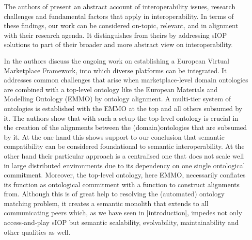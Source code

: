 \documentclass[sort&compress,preprint,authoryear,3p,twocolumn]{elsarticle}
\begin{document}
The authors of \citep{Pagano2013a} present an abstract account of
interoperability issues, research challenges and fundamental factors
that apply in interoperability. In terms of these findings, our work can
be considered on-topic, relevant, and in alignment with their research
agenda. It distinguishes from theirs by addressing sIOP solutions to
part of their broader and more abstract view on interoperability.

In \citep{Horsch2020} the authors discuss the ongoing work on
establishing a European Virtual Marketplace Framework, into which
diverse platforms can be integrated. It addresses common challenges that
arise when marketplace-level domain ontologies are combined with a
top-level ontology like the European Materials and Modelling Ontology
(EMMO) by ontology alignment. A multi-tier system of ontologies is
established with the EMMO at the top and all others subsumed by it. The
authors show that with such a setup the top-level ontology is crucial in
the creation of the alignments between the (domain)ontologies that are
subsumed by it. At the one hand this shows support to our conclusion
that semantic compatibility can be considered foundational to semantic
interoperability. At the other hand their particular approach is a
centralised one that does not scale well in large distributed
environments due to its dependency on one single ontological commitment.
Moreover, the top-level ontology, here EMMO, necessarily conflates its
function as ontological commitment with a function to construct
alignments from. Although this is of great help to resolving the
(automated) ontology matching problem, it creates a semantic monolith
that extends to all communicating peers which, as we have seen in
\cref{introduction}, impedes not only access-and-play sIOP but semantic
scalability, evolvability, maintainability and other qualities as well.
\end{document}
